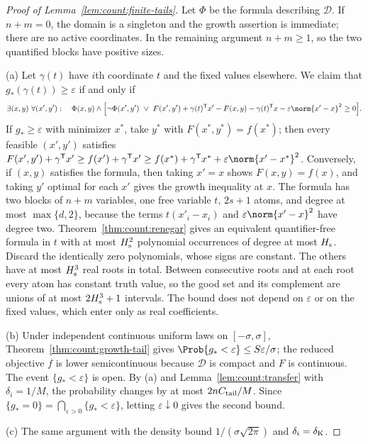 \begin{proof}[Proof of Lemma~\ref{lem:count:finite-tails}]
Let $\Phi$ be the formula describing $\mathcal D$.
If $n+m=0$, the domain is a singleton and the growth assertion is immediate;
there are no active coordinates. In the remaining argument $n+m\ge1$, so
the two quantified blocks have positive sizes.

(a) Let $\gamma(t)$ have $i$th coordinate $t$ and the fixed values elsewhere.
We claim that $g_*(\gamma(t))\ge\varepsilon$ if and only if
\[
 \exists(x,y)\ \forall(x',y'):\quad
 \Phi(x,y)\wedge\Bigl[\neg\Phi(x',y')\ \vee\
 F(x',y')+\gamma(t)^{\mathsf T} x'-F(x,y)-\gamma(t)^{\mathsf T} x-\varepsilon\norm{x'-x}^2\ge0\Bigr].
\]
If $g_*\ge\varepsilon$ with minimizer $x^*$, take $y^*$ with
$F(x^*,y^*)=f(x^*)$; then every feasible $(x',y')$ satisfies
$F(x',y')+\gamma^{\mathsf T} x'\ge f(x')+\gamma^{\mathsf T} x'\ge f(x^*)+\gamma^{\mathsf T} x^*+\varepsilon\norm{x'-x^*}^2$.
Conversely, if $(x,y)$ satisfies the formula, then taking $x'=x$ shows
$F(x,y)=f(x)$, and taking $y'$ optimal for each $x'$ gives the growth
inequality at $x$. The formula has two blocks of $n+m$ variables, one free
variable $t$, $2s+1$ atoms, and degree at most $\max\{d,2\}$, because the
terms $t(x'_i-x_i)$ and $\varepsilon\norm{x'-x}^2$ have degree two. Theorem~\ref{thm:count:renegar}
gives an equivalent quantifier-free formula in $t$ with at most $H_{\rm s}^2$
polynomial occurrences of degree at most $H_{\rm s}$. Discard the identically
zero polynomials, whose signs are constant. The others have at most
$H_{\rm s}^3$ real roots in total. Between consecutive roots and at each root
every atom has constant truth value, so the good set and its complement are
unions of at most $2H_{\rm s}^3+1$ intervals. The bound does not depend on
$\varepsilon$ or on the fixed values, which enter only as real coefficients.

(b) Under independent continuous uniform laws on $[-\sigma,\sigma]$,
Theorem~\ref{thm:count:growth-tail} gives
$\Prob\{g_*<\varepsilon\}\le S\varepsilon/\sigma$; the reduced objective $f$
is lower semicontinuous because $\mathcal D$ is compact and $F$ is
continuous. The event $\{g_*<\varepsilon\}$ is open. By (a) and
Lemma~\ref{lem:count:transfer} with $\delta_i=1/M$, the probability changes
by at most $2nC_{\rm tail}/M$. Since $\{g_*=0\}=\bigcap_{\varepsilon>0}\{g_*<\varepsilon\}$,
letting $\varepsilon\downarrow0$ gives the second bound.

(c) The same argument with the density bound $1/(\sigma\sqrt{2\pi})$ and
$\delta_i=\delta_{\rm K}$.


\end{proof}
